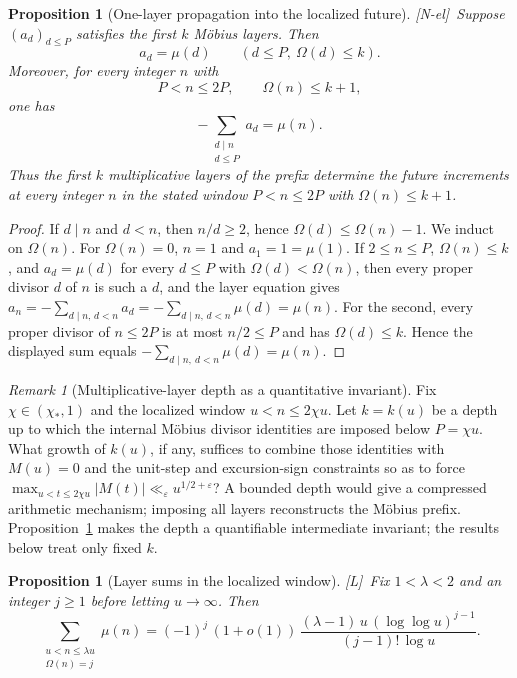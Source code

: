 \documentclass[11pt,reqno]{amsart}
\numberwithin{equation}{section}
\theoremstyle{plain}
\newtheorem{proposition}[theorem]{Proposition}
\theoremstyle{definition}
\theoremstyle{remark}
\newtheorem{remark}[theorem]{Remark}
\newcommand{\eps}{\varepsilon}
\newcommand{\tagNE}{\textup{[N-el]}}
\newcommand{\tagL}{\textup{[L]}}
\begin{document}
\begin{proposition}[One-layer propagation into the localized future]
\label{prop:layer-propagation}
\tagNE\ Suppose $(a_d)_{d\le P}$ satisfies the first $k$ M\"obius layers. Then
\begin{equation}
a_d=\mu(d)\qquad(d\le P,\ \Omega(d)\le k).
\end{equation}
Moreover, for every integer $n$ with
\begin{equation}
P<n\le2P,\qquad\Omega(n)\le k+1,
\end{equation}
one has
\begin{equation}
-\sum_{\substack{d\mid n\\d\le P}}a_d=\mu(n).
\end{equation}
Thus the first $k$ multiplicative layers of the prefix determine the
future increments at every integer $n$ in the stated window
$P<n\le2P$ with $\Omega(n)\le k+1$.
\end{proposition}

\begin{proof}
If $d\mid n$ and $d<n$, then $n/d\ge2$, hence $\Omega(d)\le\Omega(n)-1$.
We induct on $\Omega(n)$. For $\Omega(n)=0$, $n=1$ and $a_1=1=\mu(1)$. If
$2\le n\le P$, $\Omega(n)\le k$, and $a_d=\mu(d)$ for every $d\le P$ with
$\Omega(d)<\Omega(n)$, then every proper divisor $d$ of $n$ is such a $d$, and
the layer equation gives
$a_n=-\sum_{d\mid n,\,d<n}a_d=-\sum_{d\mid n,\,d<n}\mu(d)=\mu(n)$.  For the second, every
proper divisor of $n\le2P$ is at most $n/2\le P$ and has
$\Omega(d)\le k$.  Hence the displayed sum equals
$-\sum_{d\mid n,\ d<n}\mu(d)=\mu(n)$.
\end{proof}

\begin{remark}[Multiplicative-layer depth as a quantitative invariant]
\label{q:layer-depth}
Fix $\chi\in(\chi_*,1)$ and the localized window $u<n\le2\chi u$.
Let $k=k(u)$ be a depth up to which the internal M\"obius divisor identities
are imposed below $P=\chi u$. What growth of $k(u)$, if any, suffices to
combine those identities with $M(u)=0$ and the unit-step and excursion-sign
constraints so as to force
$\max_{u<t\le2\chi u}|M(t)|\ll_\eps u^{1/2+\eps}$? A bounded depth would
give a compressed arithmetic mechanism; imposing all layers reconstructs the
M\"obius prefix. Proposition~\ref{prop:layer-propagation} makes the depth a
quantifiable intermediate invariant; the results below treat only fixed
$k$.
\end{remark}
\begin{proposition}[Layer sums in the localized window]
\label{prop:layer-sums}
\tagL\ Fix $1<\lambda<2$ and an integer $j\ge1$ before letting $u\to\infty$. Then
\begin{equation}
\label{eq:layer-sum}
\sum_{\substack{u<n\le\lambda u\\ \Omega(n)=j}}\mu(n)
=(-1)^j\,(1+o(1))\,\frac{(\lambda-1)\,u\,(\log\log u)^{j-1}}{(j-1)!\,\log u}.
\end{equation}
\end{proposition}
\end{document}
